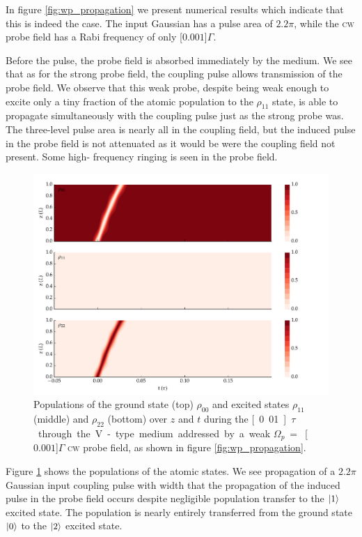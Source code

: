     In figure \ref{fig:wp_propagation} we present numerical results which
    indicate that this is indeed the case. The input Gaussian has a pulse area
    of $2.2\pi$, while the \textsc{cw} probe field has a Rabi frequency of only
    \unit[$0.001$]{$\Gamma$}.

    Before the pulse, the probe field is absorbed immediately by the medium. We
    see that as for the strong probe field, the coupling pulse allows
    transmission of the probe field. We observe that this weak probe, despite
    being weak enough to excite only a tiny fraction of the atomic population to
    the $\rho_{11}$ state, is able to propagate simultaneously with the coupling
    pulse just as the strong probe was.  The three-level pulse area is nearly
    all in the coupling field, but the induced pulse in the probe field is not
    attenuated as it would be were the coupling field not present. Some high-
    frequency ringing is seen in the probe field.
    \begin{figure}[]
      \includegraphics[width=\linewidth]
        {figs/06_simultons/mb_vee_wpsit_plot_001c_22pip_Ng1e3_fig2.pdf}
      \caption{
      Populations of the ground state (top) $\rho_{00}$ and excited states
      $\rho_{11}$ (middle) and $\rho_{22}$ (bottom) over $z$ and $t$ during the
      \unit[0.01]{$\tau$} through the V-type medium addressed by a weak
      $\Omega_p~=$~\unit[$0.001$]{$\Gamma$} \textsc{cw} probe field, as shown in
      figure \ref{fig:wp_propagation}.
      } 
      \label{fig:wp_pops} 
    \end{figure}

    Figure \ref{fig:wp_pops} shows the populations of the atomic states. We see
    propagation of a $2.2\pi$ Gaussian input coupling pulse with width that the
    propagation of the induced pulse in the probe field occurs despite
    negligible population transfer to the $\Ket{1}$ excited state. The
    population is nearly entirely transferred from the ground state $\Ket{0}$ to
    the $\Ket{2}$ excited state.


